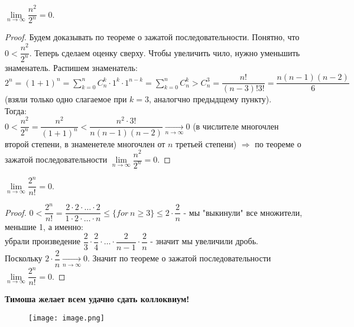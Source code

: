 \documentclass[12pt]{article}
\begin{document}
 $\lim\limits_{n \to \infty} \dfrac{n^2}{2^n} = 0$.
\begin{proof}
    Будем доказывать по теореме о зажатой последовательности. Понятно, что $0 <  \dfrac{n^2}{2^n}$. Теперь сделаем оценку сверху. Чтобы увеличить чило, нужно уменьшить знаменатель. Распишем знаменатель: $2^n = (1 + 1)^n = \sum\limits_{k = 0}^{n}C_n^k\cdot1^k\cdot1^{n-k} = \sum\limits_{k = 0}^{n}C_n^k > C_n^3 = \dfrac{n!}{(n-3)!3! } = \dfrac{n(n-1)(n-2)}{6}$ (взяли только одно слагаемое при $k = 3$, аналогчно предыдщему пункту). \\ Тогда: \\
    $0 < \dfrac{n^2}{2^n} = \dfrac{n^2}{(1+1)^n} < \dfrac{n^2 \cdot 3!}{n(n-1)(n-2)} \xrightarrow[n \to \infty]{} 0$ (в числителе многочлен второй степени, в знаменетеле многочлен от $n$ третьей степени) $\Rightarrow$ по теореме о зажатой последовательности $\lim\limits_{n \to \infty} \dfrac{n^2}{2^n} = 0$. 
\end{proof}

 $\lim\limits_{n \to \infty} \dfrac{2^n}{n!} = 0$.
\begin{proof}
    $0 < \dfrac{2^n}{n!} = \dfrac{2 \cdot 2 \cdot \dots \cdot 2}{1 \cdot 2 \cdot \dots \cdot n} \leq \{for \ n \geq 3\} \leq 2 \cdot \dfrac{2}{n}$ - мы "выкинули" все множители, меньшие 1, а именно: \\ убрали произведение $\dfrac{2}{3}\cdot \dfrac{2}{4} \cdot \dots \cdot \dfrac{2}{n-1} \cdot \dfrac{2}{n}$ - значит мы увеличили дробь. \\
    Поскольку $2 \cdot \dfrac2n \xrightarrow[n \to \infty]{} 0$. Значит по теореме о зажатой последовательности $\lim\limits_{n \to \infty} \dfrac{2^n}{n!} = 0$.
\end{proof}

\newpage
\begin{center}
    \Huge \textbf{Тимоша желает всем удачно сдать коллоквиум!}
\end{center}

\begin{figure}
    \centering
    \texttt{[image: image.png]}
    \label{fig:enter-label}
\end{figure}
\end{document}
